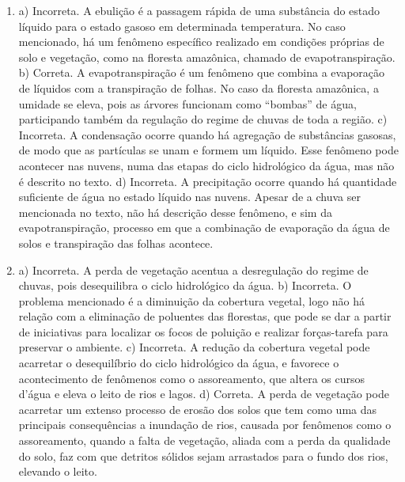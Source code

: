 \begin{enumerate}
\item
a) Incorreta. A ebulição é a passagem rápida de uma substância do estado
líquido para o estado gasoso em determinada temperatura. No caso
mencionado, há um fenômeno específico realizado em condições próprias de
solo e vegetação, como na floresta amazônica, chamado de
evapotranspiração. 
b) Correta. A evapotranspiração é um fenômeno que combina a evaporação
de líquidos com a transpiração de folhas. No caso da floresta amazônica,
a umidade se eleva, pois as árvores funcionam como “bombas” de água,
participando também da regulação do regime de chuvas de toda a região.
c) Incorreta. A condensação ocorre quando há agregação de substâncias
gasosas, de modo que as partículas se unam e formem um líquido. Esse
fenômeno pode acontecer nas nuvens, numa das etapas do ciclo hidrológico
da água, mas não é descrito no texto.
d) Incorreta. A precipitação ocorre quando há quantidade suficiente de
água no estado líquido nas nuvens. Apesar de a chuva ser
mencionada no texto, não há descrição desse fenômeno, e sim da
evapotranspiração, processo em que a combinação de evaporação da água de
solos e transpiração das folhas acontece.

\item
a) Incorreta. A perda de vegetação acentua a desregulação do regime de
chuvas, pois desequilibra o ciclo hidrológico da água.
b) Incorreta. O problema mencionado é a diminuição da cobertura vegetal,
logo não há relação com a eliminação de poluentes das florestas, que
pode se dar a partir de iniciativas para localizar os focos de poluição
e realizar forças-tarefa para preservar o ambiente.
c) Incorreta. A redução da cobertura vegetal pode acarretar o
desequilíbrio do ciclo hidrológico da água, e favorece o acontecimento
de fenômenos como o assoreamento, que altera os cursos d'água e eleva o
leito de rios e lagos.
d) Correta. A perda de vegetação pode acarretar um extenso processo de
erosão dos solos que tem como uma das principais consequências a
inundação de rios, causada por fenômenos como o assoreamento, quando a
falta de vegetação, aliada com a perda da qualidade do solo, faz com que
detritos sólidos sejam arrastados para o fundo dos rios, elevando o
leito.


\end{enumerate}
